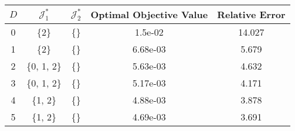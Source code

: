 \begin{subtable}{\textwidth}
\centering
\begin{tabular}{|c|c|c|c|c|}
  \hline
$D$ & $\mathcal J_1^*$ & $\mathcal J_2^*$ & Optimal Objective Value & Relative Error \\ 
  \hline
0 & \{2\} & \{\} & 1.5e-02 & 14.027 \\ 
  1 & \{2\} & \{\} & 6.68e-03 & 5.679 \\ 
  2 & \{0, 1, 2\} & \{\} & 5.63e-03 & 4.632 \\ 
  3 & \{0, 1, 2\} & \{\} & 5.17e-03 & 4.171 \\ 
  4 & \{1, 2\} & \{\} & 4.88e-03 & 3.878 \\ 
  5 & \{1, 2\} & \{\} & 4.69e-03 & 3.691 \\ 
   \hline
\end{tabular}
\end{subtable}
